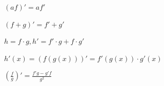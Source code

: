 \documentclass[a4paper, 8pt, landscape]{scrartcl}
\begin{document}
\begin{multicols*}{3}
\begin{compactitem}
	\item $(af)' = af'$
	
	\item $(f+g)' = f' + g'$
	
	\item $h = f\cdot g, h' = f'\cdot g + f \cdot g'$
	
	\item $h'(x) = (f(g(x)))' = f'(g(x))\cdot g'(x)$
	
	\item $(\frac{f}{g})' = \frac{f'g - g'f}{g^2}$
\end{compactitem}





	
\end{multicols*}

\setcounter{secnumdepth}{2}
\end{document}
